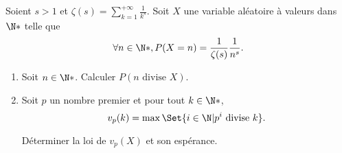 \begin{enonce}
\begin{exercise}[ID={RMS135 E975},subtitle={Mines-Ponts PSI 2024},tags={oraux},difficulty={}]
  Soient $s>1$ et $\zeta(s) = \sum\limits_{k=1}^{+\infty} \frac{1}{k^s}$.
  Soit $X$ une variable aléatoire à valeurs dans $\N*$ telle que
  \begin{equation*}
    \forall n\in\N*, P(X=n) = \frac{1}{\zeta(s)} \frac{1}{n^s}.
  \end{equation*}
  \begin{enumerate}
    \item Soit $n\in\N*$.
      Calculer $P\left( n \text{ divise } X \right)$.

    \item Soit $p$ un nombre premier et pour tout $k\in\N*$,
      \begin{equation*}
      v_p(k) = \max\Set{i\in\N | p^i \text{ divise } k}.
      \end{equation*}

    Déterminer la loi de $v_p(X)$ et son espérance.
  \end{enumerate}
\end{exercise}
\begin{solution}
\end{solution}
\end{enonce}
